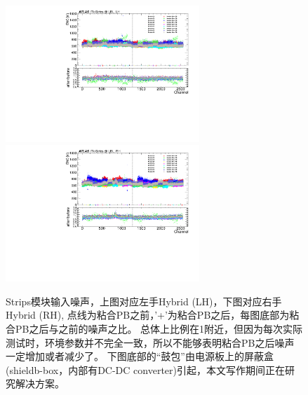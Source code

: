 \begin{figure}[h]
\centering
 \includegraphics[width=0.65\textwidth, angle=-90]{fig/LH_noise.pdf} \\
  \includegraphics[width=0.65\textwidth, angle=-90]{fig/RH_noise.pdf} 
 \caption{Strips模块输入噪声，上图对应左手Hybrid (LH)，下图对应右手Hybrid (RH), 点线为粘合PB之前，'+'为粘合PB之后，每图底部为粘合PB之后与之前的噪声之比。
 总体上比例在1附近，但因为每次实际测试时，环境参数并不完全一致，所以不能够表明粘合PB之后噪声一定增加或者减少了。
下图底部的“鼓包”由电源板上的屏蔽盒(shieldb-box，内部有DC-DC converter)引起，本文写作期间正在研究解决方案。}
 \label{fig:strips_testing_noise}
\end{figure}
